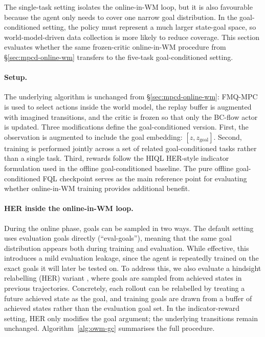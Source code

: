 The single-task setting isolates the online-in-WM loop, but it is also
favourable because the agent only needs to cover one narrow goal
distribution. In the goal-conditioned setting, the policy must represent
a much larger state-goal space, so world-model-driven data collection is
more likely to reduce coverage.
This section evaluates whether the same frozen-critic online-in-WM
procedure from \S\ref{sec:mpcd-online-wm} transfers to the
five-task goal-conditioned setting.

\paragraph{Setup.}
The underlying algorithm is unchanged from
\S\ref{sec:mpcd-online-wm}: FMQ-MPC is used to select actions inside
the world model, the replay buffer is augmented with imagined
transitions, and the critic is frozen so that only the BC-flow actor
is updated.
Three modifications define the goal-conditioned version. First, the
observation is augmented to include the goal embedding:
$[z, z_{\text{goal}}]$. Second, training is performed jointly across a
set of related goal-conditioned tasks rather than a single task. Third,
rewards follow the HIQL HER-style indicator formulation used in the
offline goal-conditioned baseline.
The pure offline goal-conditioned FQL checkpoint serves as the main
reference point for evaluating whether online-in-WM training provides
additional benefit.

\paragraph{HER inside the online-in-WM loop.}
During the online phase, goals can be sampled in two ways.
The default setting uses evaluation goals directly (``eval-goals''),
meaning that the same goal distribution appears both during training
and evaluation. While effective, this introduces a mild evaluation
leakage, since the agent is repeatedly trained on the exact goals it
will later be tested on.
To address this, we also evaluate a hindsight relabelling (HER)
variant \cite{her}, where goals are sampled from achieved states in
previous trajectories. Concretely, each rollout can be relabelled by
treating a future achieved state as the goal, and training goals are
drawn from a buffer of achieved states rather than the evaluation goal
set. In the indicator-reward setting, HER only modifies the goal
argument; the underlying transitions remain unchanged.
Algorithm~\ref{alg:owm-gc} summarises the full procedure.

